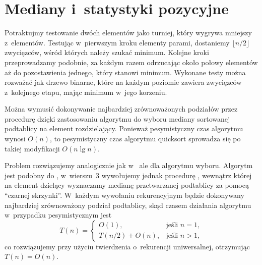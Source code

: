 \chapter{Mediany i~statystyki pozycyjne}


\exercise %
Potraktujmy testowanie dwóch elementów jako turniej, który wygrywa mniejszy z~elementów. Testując w~pierwszym kroku elementy parami, dostaniemy $\lfloor n/2\rfloor$ zwycięzców, wśród których należy szukać minimum. Kolejne kroki przeprowadzamy podobnie, za każdym razem odrzucając około połowy elementów aż do pozostawienia jednego, który stanowi minimum. Wykonane testy można rozważać jak drzewo binarne, które na każdym poziomie zawiera zwycięzców z~kolejnego etapu, mając minimum w~jego korzeniu.

\exercise %


\exercise %
\exercise %
\exercise %
\exercise %


\exercise %
\exercise %

\exercise %
Można wymusić dokonywanie najbardziej zrównoważonych podziałów przez procedurę  dzięki zastosowaniu algorytmu  do wyboru mediany sortowanej podtablicy na element rozdzielający. Ponieważ pesymistyczny czas algorytmu  wynosi $O(n)$, to pesymistyczny czas algorytmu quicksort sprowadza się po takiej modyfikacji $O(n\lg n)$.

\exercise %

\exercise %
Problem rozwiązujemy analogicznie jak w~ ale dla algorytmu wyboru. Algorytm jest podobny do , w~wierszu~3 wywołujemy jednak procedurę , wewnątrz której na element dzielący wyznaczamy medianę przetwarzanej podtablicy za pomocą ``czarnej skrzynki''. W~każdym wywołaniu rekurencyjnym będzie dokonywany najbardziej zrównoważony podział podtablicy, skąd czasem działania algorytmu w~przypadku pesymistycznym jest
\[
	T(n) =
	\begin{cases}
		O(1), & \text{jeśli $n=1$}, \\
		T(n/2)+O(n), & \text{jeśli $n>1$},
	\end{cases}
\]
co rozwiązujemy przy użyciu twierdzenia o~rekurencji uniwersalnej, otrzymując $T(n)=O(n)$.

